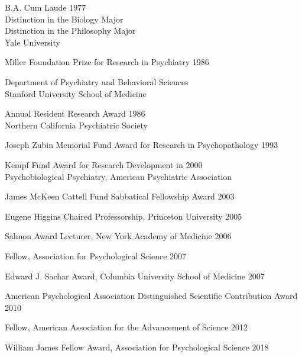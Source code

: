\documentclass[10 pt]{article}
\begin{document}
B.A. Cum Laude \hspace{4.5in} 1977
\\Distinction in the Biology Major
\\Distinction in the Philosophy Major
\\Yale University
    \smallskip

Miller Foundation Prize for Research in Psychiatry \hspace{2.44in} 1986

Department of Psychiatry and Behavioral Sciences
\\Stanford University School of Medicine
    \smallskip

Annual Resident Research Award \hspace{3.5in} 1986
\\Northern California Psychiatric Society
    \smallskip

Joseph Zubin Memorial Fund Award for Research in Psychopathology \hspace{1.28in} 1993
    \smallskip

Kempf Fund Award for Research Development in \hspace{2.55in} 2000
\\Psychobiological Psychiatry, American Psychiatric Association
    \smallskip

James McKeen Cattell Fund Sabbatical Fellowship Award \hspace{2.02in} 2003
    \smallskip

Eugene Higgins Chaired Professorship, Princeton University \hspace{1.91in} 2005
    \smallskip

Salmon Award Lecturer, New York Academy of Medicine \hspace{2.07in} 2006
    \smallskip

Fellow, Association for Psychological Science \hspace{2.84in} 2007
    \smallskip

Edward J. Sachar Award, Columbia University School of Medicine \hspace{1.52in} 2007
    \smallskip

American Psychological Association Distinguished Scientific Contribution Award \hspace{0.65in} 2010
    \smallskip

Fellow, American Association for the Advancement of Science \hspace{1.81in} 2012
    \smallskip

William James Fellow Award, Association for Psychological Science \hspace{1.45in} 2018
    \smallskip
\end{document}
